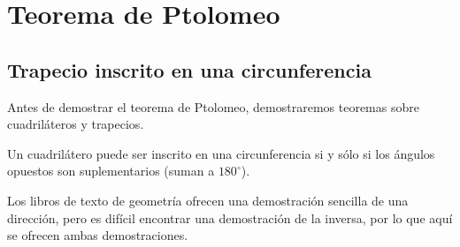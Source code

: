 
\section{Teorema de Ptolomeo}\label{a.ptolemy}


\subsection{Trapecio inscrito en una circunferencia}\label{s.circumscribed}

Antes de demostrar el teorema de Ptolomeo, demostraremos teoremas sobre cuadriláteros y trapecios.

\begin{theorem}\label{thm.quad-circum}
Un cuadrilátero puede ser inscrito en una circunferencia si y sólo si los ángulos opuestos son suplementarios (suman a $180^\circ$).
\end{theorem}

Los libros de texto de geometría ofrecen una demostración sencilla de una dirección, pero es difícil encontrar una demostración de la inversa, por lo que aquí se ofrecen ambas demostraciones.

